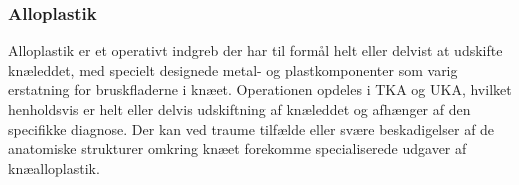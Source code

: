 
\subsubsection{Alloplastik}
Alloplastik er et operativt indgreb der har til formål helt eller delvist at udskifte knæleddet, med specielt designede metal- og plastkomponenter som varig erstatning for bruskfladerne i knæet. Operationen opdeles i TKA og UKA, hvilket henholdsvis er helt eller delvis udskiftning af knæleddet og afhænger af den specifikke diagnose. Der kan ved traume tilfælde eller svære beskadigelser af de anatomiske strukturer omkring knæet forekomme specialiserede udgaver af knæalloplastik.

